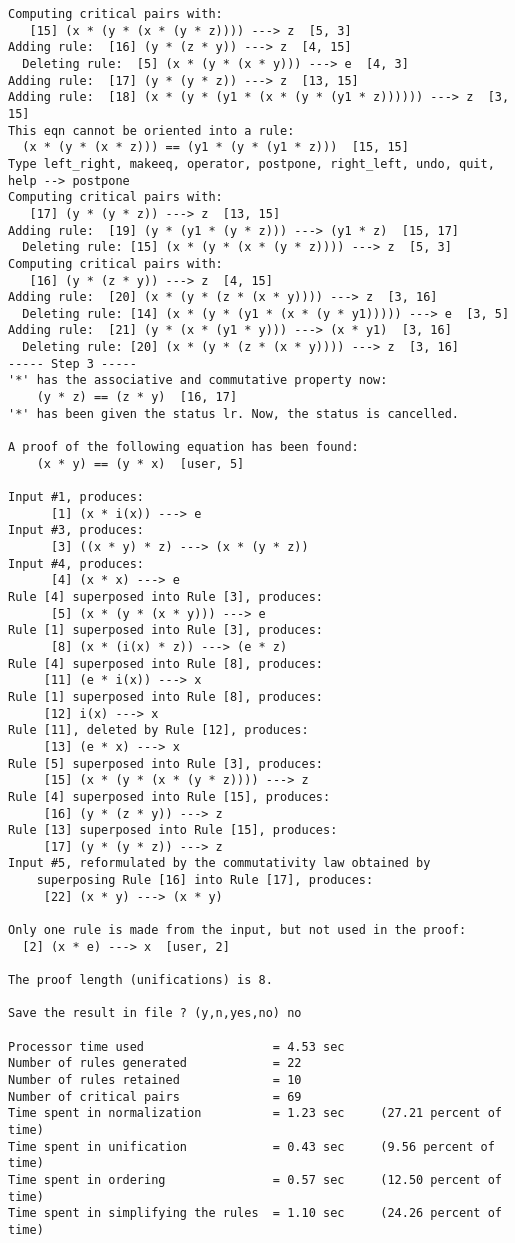 \begin{verbatim}
Computing critical pairs with: 
   [15] (x * (y * (x * (y * z)))) ---> z  [5, 3]
Adding rule:  [16] (y * (z * y)) ---> z  [4, 15]
  Deleting rule:  [5] (x * (y * (x * y))) ---> e  [4, 3]
Adding rule:  [17] (y * (y * z)) ---> z  [13, 15]
Adding rule:  [18] (x * (y * (y1 * (x * (y * (y1 * z)))))) ---> z  [3, 15]
This eqn cannot be oriented into a rule: 
  (x * (y * (x * z))) == (y1 * (y * (y1 * z)))  [15, 15]
Type left_right, makeeq, operator, postpone, right_left, undo, quit, help --> postpone
Computing critical pairs with: 
   [17] (y * (y * z)) ---> z  [13, 15]
Adding rule:  [19] (y * (y1 * (y * z))) ---> (y1 * z)  [15, 17]
  Deleting rule: [15] (x * (y * (x * (y * z)))) ---> z  [5, 3]
Computing critical pairs with: 
   [16] (y * (z * y)) ---> z  [4, 15]
Adding rule:  [20] (x * (y * (z * (x * y)))) ---> z  [3, 16]
  Deleting rule: [14] (x * (y * (y1 * (x * (y * y1))))) ---> e  [3, 5]
Adding rule:  [21] (y * (x * (y1 * y))) ---> (x * y1)  [3, 16]
  Deleting rule: [20] (x * (y * (z * (x * y)))) ---> z  [3, 16]
----- Step 3 -----
'*' has the associative and commutative property now: 
    (y * z) == (z * y)  [16, 17]
'*' has been given the status lr. Now, the status is cancelled.

A proof of the following equation has been found:
    (x * y) == (y * x)  [user, 5]

Input #1, produces: 
      [1] (x * i(x)) ---> e
Input #3, produces: 
      [3] ((x * y) * z) ---> (x * (y * z))
Input #4, produces: 
      [4] (x * x) ---> e
Rule [4] superposed into Rule [3], produces: 
      [5] (x * (y * (x * y))) ---> e
Rule [1] superposed into Rule [3], produces: 
      [8] (x * (i(x) * z)) ---> (e * z)
Rule [4] superposed into Rule [8], produces: 
     [11] (e * i(x)) ---> x
Rule [1] superposed into Rule [8], produces: 
     [12] i(x) ---> x
Rule [11], deleted by Rule [12], produces: 
     [13] (e * x) ---> x
Rule [5] superposed into Rule [3], produces: 
     [15] (x * (y * (x * (y * z)))) ---> z
Rule [4] superposed into Rule [15], produces: 
     [16] (y * (z * y)) ---> z
Rule [13] superposed into Rule [15], produces: 
     [17] (y * (y * z)) ---> z
Input #5, reformulated by the commutativity law obtained by 
    superposing Rule [16] into Rule [17], produces: 
     [22] (x * y) ---> (x * y)

Only one rule is made from the input, but not used in the proof:
  [2] (x * e) ---> x  [user, 2]

The proof length (unifications) is 8.

Save the result in file ? (y,n,yes,no) no

Processor time used                  = 4.53 sec
Number of rules generated            = 22
Number of rules retained             = 10
Number of critical pairs             = 69
Time spent in normalization          = 1.23 sec     (27.21 percent of time)
Time spent in unification            = 0.43 sec     (9.56 percent of time)
Time spent in ordering               = 0.57 sec     (12.50 percent of time)
Time spent in simplifying the rules  = 1.10 sec     (24.26 percent of time)
\end{verbatim}
\rm
\normalsize
